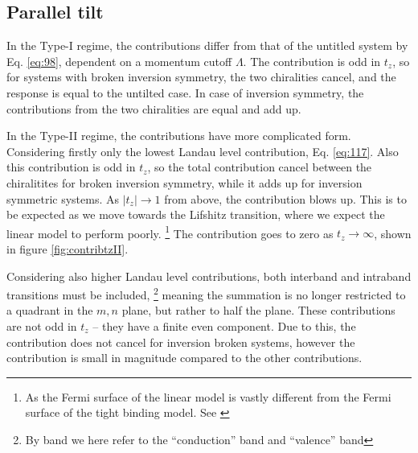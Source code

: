\subsection{Parallel tilt}
In the Type-I regime, the contributions differ from that of the untitled system by Eq. \eqref{eq:98}, dependent on a momentum cutoff \( \Lambda \).
The contribution is odd in \( t_z \), so for systems with broken inversion symmetry, the two chiralities cancel, and the response is equal to the untilted case.
In case of inversion symmetry, the contributions from the two chiralities are equal and add up.

In the Type-II regime, the contributions have more complicated form.
Considering firstly only the lowest Landau level contribution, Eq. \eqref{eq:117}.
Also this contribution is odd in \( t_z \), so the total contribution cancel between the chiralitites for broken inversion symmetry, while it adds up for inversion symmetric systems.
As \( |t_z| \to 1 \) from above, the contribution blows up.
This is to be expected as we move towards the Lifshitz transition, where we expect the linear model to perform poorly.
\footnote{As the Fermi surface of the linear model is vastly different from the Fermi surface of the tight binding model.
See \textcite{vanderwurffMagnetovorticalThermoelectricTransport2019}}
The contribution goes to zero as \( t_z \to \infty \), shown in figure \ref{fig:contribtzII}.

Considering also higher Landau level contributions, both interband and intraband transitions must be included,
\footnote{By band we here refer to the ``conduction'' band and ``valence'' band}
meaning the summation is no longer restricted to a quadrant in the \( m,n \) plane, but rather to half the plane.
These contributions are not odd in \( t_z \) -- they have a finite even component.
Due to this, the contribution does not cancel for inversion broken systems, however the contribution is small in magnitude compared to the other contributions.


